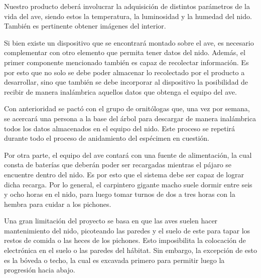 



Nuestro producto deberá involucrar la adquisición de distintos parámetros de la vida del ave, siendo estos la temperatura, la luminosidad y la humedad del nido. También es pertinente obtener imágenes del interior. 

Si bien existe un dispositivo que se encontrará montado sobre el ave, es necesario complementar con otro elemento que permita tener datos del nido. Además, el primer componente mencionado también es capaz de recolectar información. Es por esto que no solo se debe poder almacenar lo recolectado por el producto a desarrollar, sino que también se debe incorporar al dispositivo la posibilidad de recibir de manera inalámbrica aquellos datos que obtenga el equipo del ave. 

Con anterioridad se pactó con el grupo de ornitólogas que, una vez por semana, se acercará una persona a la base del árbol para descargar de manera inalámbrica todos los datos almacenados en el equipo del nido. Este proceso se repetirá durante todo el proceso de anidamiento del espécimen en cuestión.

Por otra parte, el equipo del ave contará con una fuente de alimentación, la cual consta de baterías que deberán poder ser recargadas mientras el pájaro se encuentre dentro del nido. Es por esto que el sistema debe ser capaz de lograr dicha recarga. Por lo general, el carpintero gigante macho suele dormir entre seis y ocho horas en el nido, para luego tomar turnos de dos a tres horas con la hembra para cuidar a los pichones.

Una gran limitación del proyecto se basa en que las aves suelen hacer mantenimiento del nido, picoteando las paredes y el suelo de este para tapar los restos de comida o las heces de los pichones. Esto imposibilita la colocación de electrónica en el suelo o las paredes del hábitat. Sin embargo, la excepción de esto es la bóveda o techo, la cual es excavada primero para permitir luego la progresión hacia abajo.


